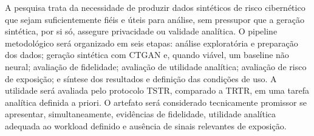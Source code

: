 
\begin{resumo}
A pesquisa trata da necessidade de produzir dados sintéticos de risco
cibernético que sejam suficientemente fiéis e úteis para análise, sem pressupor
que a geração sintética, por si só, assegure privacidade ou validade analítica.
O pipeline metodológico será organizado em seis etapas: análise exploratória e
preparação dos dados; geração sintética com CTGAN e, quando viável, um baseline
não neural; avaliação de fidelidade; avaliação de utilidade analítica; avaliação
de risco de exposição; e síntese dos resultados e definição das condições de
uso. A utilidade será avaliada pelo protocolo TSTR, comparado a TRTR, em uma
tarefa analítica definida a priori. O artefato será considerado tecnicamente
promissor se apresentar, simultaneamente, evidências de fidelidade, utilidade
analítica adequada ao workload definido e ausência de sinais relevantes de
exposição.
\end{resumo}
